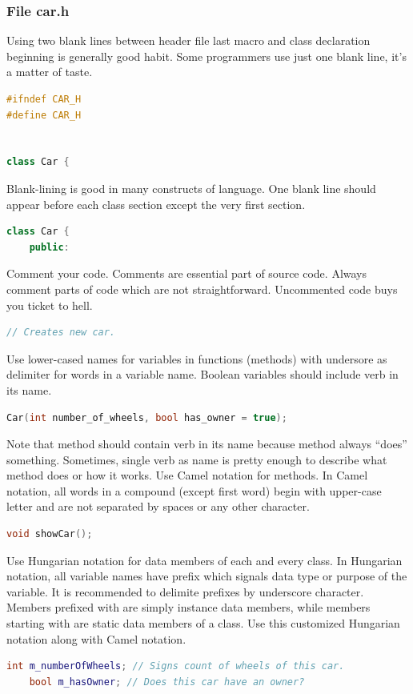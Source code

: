 \subsubsection*{File car.h}
Using two blank lines between header file last macro and class declaration beginning is generally good habit. Some programmers use just one blank line, it's a matter of taste.
\begin{lstlisting}[firstnumber=1,language=cpp]
#ifndef CAR_H
#define CAR_H


class Car {
\end{lstlisting}
Blank-lining is good in many constructs of \cpp language. One blank line should appear before each class section except the very first section.
\begin{lstlisting}[firstnumber=5,language=cpp]
class Car {
    public:
\end{lstlisting}
Comment your code. Comments are essential part of source code. Always comment parts of code which are not straightforward. Uncommented code buys you ticket to hell.
\begin{lstlisting}[firstnumber=7,language=cpp]
	// Creates new car.
\end{lstlisting}
Use lower-cased names for variables in functions (methods) with undersore as delimiter for words in a variable name. Boolean variables should include verb in its name.
\begin{lstlisting}[firstnumber=8,language=cpp]
	Car(int number_of_wheels, bool has_owner = true);
\end{lstlisting}
Note that method should contain verb in its name because method always \enquote{does} something. Sometimes, single verb as name is pretty enough to describe what method does or how it works. Use Camel notation for methods. In Camel notation, all words in a compound (except first word) begin with upper-case letter and are not separated by spaces or any other character.
\begin{lstlisting}[firstnumber=11,language=cpp]
	void showCar();
\end{lstlisting}
Use Hungarian notation for data members of each and every class. In Hungarian notation, all variable names have prefix which signals data type or purpose of the variable. It is recommended to delimite prefixes by underscore character. Members prefixed with are simply instance data members, while members starting with are static data members of a class. Use this customized Hungarian notation along with Camel notation.
\begin{lstlisting}[firstnumber=14,language=cpp]
	int m_numberOfWheels; // Signs count of wheels of this car.
	bool m_hasOwner; // Does this car have an owner?
\end{lstlisting}

